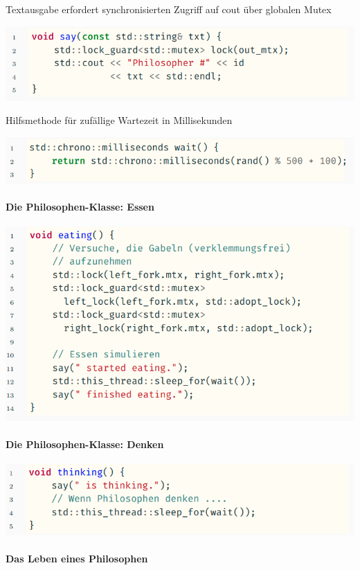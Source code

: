 \documentclass[10pt]{article}
\begin{document}
Textausgabe erfordert synchronisierten Zugriff auf cout über globalen Mutex
\begin{center}
  \includegraphics[width=0.4\linewidth]{Assets/Programmierparadigmen-code-snippet-27}
\end{center}

Hilfsmethode für zufällige Wartezeit in Millisekunden
\begin{center}
  \includegraphics[width=0.4\linewidth]{Assets/Programmierparadigmen-code-snippet-28}
\end{center}

\paragraph{Die Philosophen-Klasse: Essen}

\begin{center}
  \includegraphics[width=0.4\linewidth]{Assets/Programmierparadigmen-code-snippet-29}
\end{center}

\paragraph{Die Philosophen-Klasse: Denken}

\begin{center}
  \includegraphics[width=0.4\linewidth]{Assets/Programmierparadigmen-code-snippet-30}
\end{center}

\paragraph{Das Leben eines Philosophen}
\end{document}
